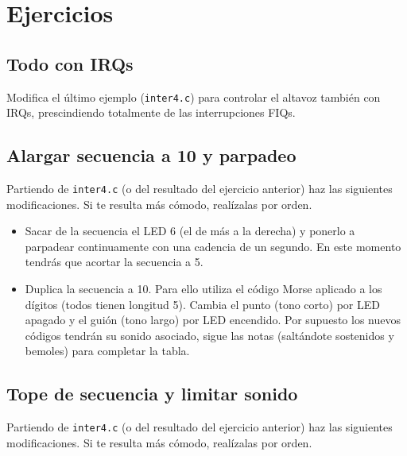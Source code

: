 \section{Ejercicios}

\subsection{Todo con IRQs}

Modifica el último ejemplo ({\tt inter4.c}) para controlar el altavoz también con IRQs,
prescindiendo totalmente de las interrupciones FIQs.

\subsection{Alargar secuencia a 10 y parpadeo}

Partiendo de {\tt inter4.c} (o del resultado del ejercicio anterior) haz las siguientes
modificaciones. Si te resulta más cómodo, realízalas por orden.

\begin{itemize}
  \item Sacar de la secuencia el LED 6 (el de más a la derecha) y ponerlo a parpadear
        continuamente con una cadencia de un segundo. En este momento tendrás que acortar
        la secuencia a 5.
  \item Duplica la secuencia a 10. Para ello utiliza el código Morse aplicado a los dígitos
        (todos tienen longitud 5). Cambia el punto (tono corto) por LED apagado y el guión
        (tono largo) por LED encendido. Por supuesto los nuevos códigos tendrán su sonido
        asociado, sigue las notas (saltándote sostenidos y bemoles) para completar la tabla.
\end{itemize}

\subsection{Tope de secuencia y limitar sonido}

Partiendo de {\tt inter4.c} (o del resultado del ejercicio anterior) haz las siguientes
modificaciones. Si te resulta más cómodo, realízalas por orden.

